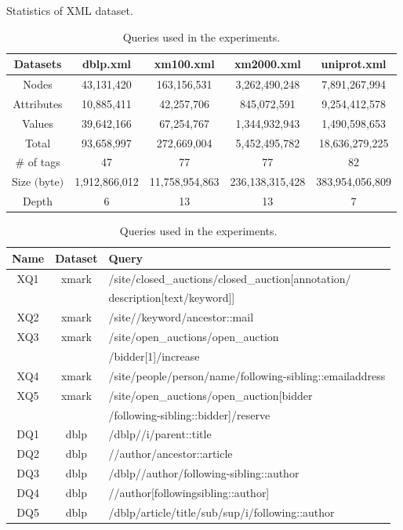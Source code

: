 \begin{table}
	\small
	\caption{Statistics of XML dataset.}
	\label{tab:datasets}
	\begin{tabular}{c|c|c|c|c}
		\hline
		Datasets & dblp.xml & xm100.xml & xm2000.xml & uniprot.xml \\
		\hline \hline
		Nodes & 43,131,420 & 163,156,531 & 3,262,490,248 & 7,891,267,994 \\
		\hline
		Attributes & 10,885,411 & 42,257,706 & 845,072,591 & 9,254,412,578 \\
		\hline
		Values & 39,642,166 & 67,254,767 & 1,344,932,943 & 1,490,598,653 \\
		\hline
		Total & 93,658,997 & 272,669,004 & 5,452,495,782 & 18,636,279,225 \\
		\hline
		\# of tags & 47 & 77 & 77 & 82 \\
		\hline
		Size $($byte$)$ & 1,912,866,012 & 11,758,954,863 & 236,138,315,428 & 383,954,056,809 \\
		\hline
		Depth & 6 & 13 & 13 & 7 \\
		\hline
	\end{tabular}
    \vspace{10px}
	\caption{Queries used in the experiments.}
	\begin{tabular}{c|c|l}
		\hline \hline
		Name & Dataset & Query  \\
		\hline
		XQ1 & xmark & /site/closed\_auctions/closed\_auction[annotation/ \\
		&&description[text/keyword]]\\
		\hline
		XQ2 & xmark & /site//keyword/ancestor::mail \\
		\hline
		XQ3 & xmark & /site/open\_auctions/open\_auction  \\
		&&/bidder[1]/increase\\
		\hline
		XQ4 & xmark & /site/people/person/name/following-sibling::emailaddress \\
		\hline
		XQ5 & xmark & /site/open\_auctions/open\_auction[bidder\\
		&&/following-sibling::bidder]/reserve\\
		\hline
		DQ1 & dblp & /dblp//i/parent::title\\
		\hline
		DQ2 & dblp & //author/ancestor::article \\
		\hline
		DQ3 & dblp & /dblp//author/following-sibling::author \\
		\hline
		DQ4 & dblp & //author[following\textemdash sibling::author] \\
		\hline
		DQ5 & dblp & /dblp/article/title/sub/sup/i/following::author \\

\end{tabular}
\end{table}
